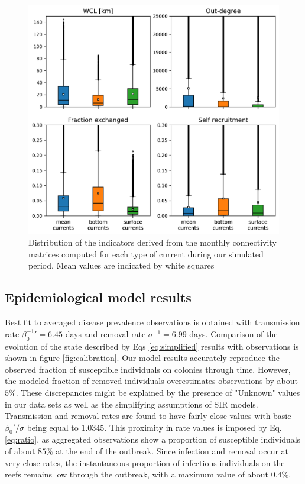 \documentclass[utf8]{frontiersSCNS}
\begin{document}
\begin{figure}
    \centering
    \includegraphics[width=.8\textwidth]{figures/connect_paper.png}
    \caption{Distribution of the indicators derived from the monthly connectivity matrices computed for each type of current during our simulated period. Mean values are indicated by white squares}
    \label{fig:connect}
\end{figure}

\subsection{Epidemiological model results}

Best fit to averaged disease prevalence observations is obtained with transmission rate $\beta_0^{-1}'=6.45$ days and removal rate $\sigma^{-1}=6.99$ days. Comparison of the evolution of the state described by Eqs \ref{eq:simplified} results with observations is shown in figure \ref{fig:calibration}. Our model results accurately reproduce the observed fraction of susceptible individuals on colonies through time. However, the modeled fraction of removed individuals overestimates observations by about $5\%$. These discrepancies might be explained by the presence of "Unknown" values in our data sets as well as the simplifying assumptions of SIR models. Transmission and removal rates are found to have fairly close values with basic  $\beta_0'/\sigma$ being equal to $1.0345$. This proximity in rate values is imposed by Eq. \ref{eq:ratio}, as aggregated observations show a proportion of susceptible individuals of about $85\%$ at the end of the outbreak. Since infection and removal occur at very close rates, the instantaneous proportion of infectious individuals on the reefs remains low through the outbreak, with a maximum value of about $0.4\%$.
\end{document}
